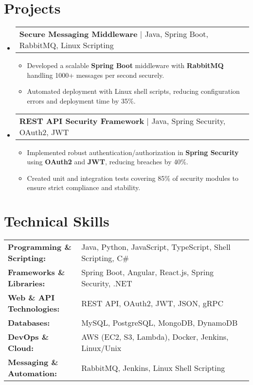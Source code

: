 \documentclass[letterpaper,11pt]{article}
\makeatletter
\newcommand{\resumeItem}[1]{
  \item\footnotesize{
    {#1 \vspace{-2pt}}
  }
}
\newcommand{\resumeProjectHeading}[2]{
    \item
    \begin{tabular*}{1.001\textwidth}{l@{\extracolsep{\fill}}r}
      \small#1 & \textbf{\small #2}\\
    \end{tabular*}\vspace{-7pt}
}
\newcommand{\resumeSubHeadingListStart}{\begin{itemize}[leftmargin=0pt, label={}]}
\newcommand{\resumeSubHeadingListEnd}{\end{itemize}}
\newcommand{\resumeItemListStart}{\begin{itemize}[leftmargin=*]}
\newcommand{\resumeItemListEnd}{\end{itemize}\vspace{-5pt}}
\makeatother
\begin{document}
\section{Projects}
    \vspace{-5pt}
    \resumeSubHeadingListStart
      \resumeProjectHeading
          {\textbf{Secure Messaging Middleware} | Java, Spring Boot, RabbitMQ, Linux Scripting}{}
          \resumeItemListStart
              \resumeItem{Developed a scalable \textbf{Spring Boot} middleware with \textbf{RabbitMQ} handling 1000+ messages per second securely.}
              \resumeItem{Automated deployment with Linux shell scripts, reducing configuration errors and deployment time by 35\%.}
          \resumeItemListEnd
          \vspace{-16pt}
      \resumeProjectHeading
          {\textbf{REST API Security Framework} | Java, Spring Security, OAuth2, JWT}{}
          \resumeItemListStart
              \resumeItem{Implemented robust authentication/authorization in \textbf{Spring Security} using \textbf{OAuth2} and \textbf{JWT}, reducing breaches by 40\%.}
              \resumeItem{Created unit and integration tests covering 85\% of security modules to ensure strict compliance and stability.}
          \resumeItemListEnd
          \vspace{-16pt}
    \resumeSubHeadingListEnd
\vspace{-10pt}
\section{Technical Skills}
        \vspace{-14pt}
        \begin{table}[h]
            \footnotesize
            \begin{tabular}{p{0.3\linewidth} p{0.7\linewidth}}
                \textbf{Programming \& Scripting:} & Java, Python, JavaScript, TypeScript, Shell Scripting, C\# \\
                \textbf{Frameworks \& Libraries:} & Spring Boot, Angular, React.js, Spring Security, .NET \\
                \textbf{Web \& API Technologies:} & REST API, OAuth2, JWT, JSON, gRPC \\
                \textbf{Databases:} & MySQL, PostgreSQL, MongoDB, DynamoDB \\
                \textbf{DevOps \& Cloud:} & AWS (EC2, S3, Lambda), Docker, Jenkins, Linux/Unix \\
                \textbf{Messaging \& Automation:} & RabbitMQ, Jenkins, Linux Shell Scripting \\
            \end{tabular}
        \end{table}
\end{document}
